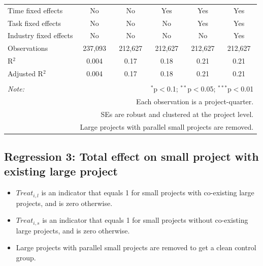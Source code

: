 \documentclass[
]{article}
\providecommand{\tightlist}{%
  \setlength{\itemsep}{0pt}\setlength{\parskip}{0pt}}
\begin{document}
\begin{table}[H]
\begin{tabular}{@{\extracolsep{-2pt}}lccccc}
Time fixed effects & No & No & Yes & Yes & Yes \\ 
Task fixed effects & No & No & No & Yes & Yes \\ 
Industry fixed effects & No & No & No & No & Yes \\ 
Observations & 237,093 & 212,627 & 212,627 & 212,627 & 212,627 \\ 
R$^{2}$ & 0.004 & 0.17 & 0.18 & 0.21 & 0.21 \\ 
Adjusted R$^{2}$ & 0.004 & 0.17 & 0.18 & 0.21 & 0.21 \\ 
\hline 
\hline \\[-1.8ex] 
\textit{Note:}  & \multicolumn{5}{r}{$^{*}$p$<$0.1; $^{**}$p$<$0.05; $^{***}$p$<$0.01} \\ 
 & \multicolumn{5}{r}{Each observation is a project-quarter.} \\ 
 & \multicolumn{5}{r}{SEs are robust and clustered at the project level.} \\ 
 & \multicolumn{5}{r}{Large projects with parallel small projects are removed.} \\ 
\end{tabular} 
\end{table}

\hypertarget{regression-3-total-effect-on-small-project-with-existing-large-project}{%
\subsection{Regression 3: Total effect on small project with existing
large
project}\label{regression-3-total-effect-on-small-project-with-existing-large-project}}

\begin{itemize}
\tightlist
\item
  \(Treat_{i,l}\) is an indicator that equals 1 for small projects with
  co-existing large projects, and is zero otherwise.
\item
  \(Treat_{i,s}\) is an indicator that equals 1 for small projects
  without co-existing large projects, and is zero otherwise.
\item
  Large projects with parallel small projects are removed to get a clean
  control group.
\end{itemize}
\end{document}

